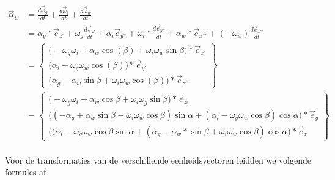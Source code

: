 \documentclass[a4paper,10pt]{article}
\begin{document}
\begin{equation}
\begin{aligned}
\vec{\alpha}_{w} &= \frac{d\vec{\omega}_{g}}{dt} + \frac{d\vec{\omega}_{i}}{dt} + \frac{d\vec{\omega}_{w}}{dt}\\
&= \alpha_g *  \vec{e}_{z'} + \omega_g  \frac{d\vec{e}_{z'}}{dt} + \alpha_i   \vec{e}_{y''} + \omega_i * \frac{d\vec{e}_{y''}}{dt} + \alpha_w * \vec{e}_{x'''} + (-\omega_w)  \frac{d\vec{e}_{x'''}}{dt}\\
&=\begin{Bmatrix}
\Big(- {\omega}_{g} {\omega}_{i} + \alpha_w\cos(\beta) +\omega_i\omega_w \sin{\beta} \Big)*\vec{e}_{x'} \\
\Big(\alpha_i - \omega_g\omega_w\cos(\beta)\Big)*\vec{e}_{y'}\\
\Big(\alpha_g  -\alpha_w\sin{\beta}+ \omega_i\omega_w\cos(\beta)\Big)*\vec{e}_{z'}
\end{Bmatrix}\\
&=\begin{Bmatrix}
\Big(- {\omega}_{g}  {\omega}_{i} + \alpha_w\cos{\beta} +\omega_i\omega_g\sin{\beta} \Big)* \vec{e}_{x} \\
\Big((-\alpha_g  +\alpha_w\sin{\beta}- \omega_i\omega_w\cos{\beta}) \sin{\alpha} + (\alpha_i - \omega_g\omega_w\cos{\beta})\cos{\alpha}  \Big) * \vec{e}_{y} \\
\Big((\alpha_i - \omega_g\omega_w\cos{\beta}\sin{\alpha} + (\alpha_g  -\alpha_w*\sin{\beta}+ \omega_i\omega_w\cos{\beta}) \cos{\alpha} \Big) * \vec{e}_{z}
\end{Bmatrix}
\end{aligned}
\end{equation}\\
Voor de transformaties van de verschillende eenheidsvectoren leidden we volgende formules af \\
\end{document}

